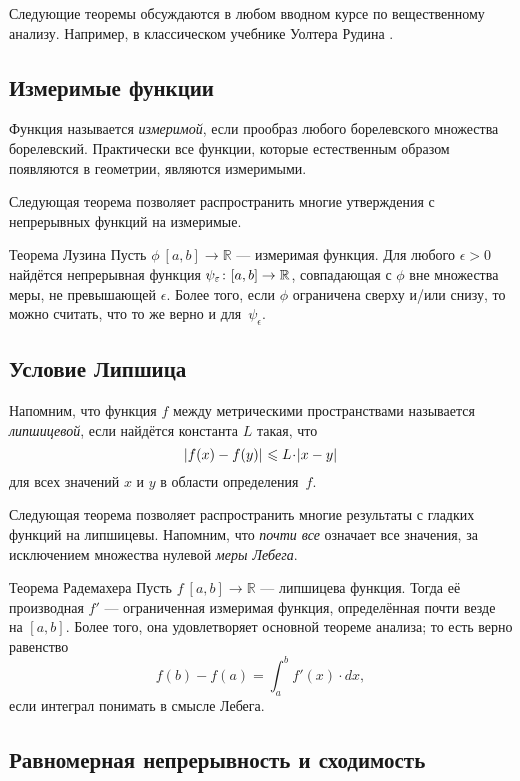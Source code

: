 Следующие теоремы обсуждаются в любом вводном курсе по вещественному анализу.
Например, в классическом учебнике Уолтера Рудина \cite{rudin}.

\subsection*{Измеримые функции}

Функция называется \emph{измеримой}, если прообраз любого борелевского множества борелевский.
Практически все функции, которые естественным образом появляются в геометрии, являются измеримыми.

Следующая теорема позволяет распространить многие утверждения с непрерывных функций на измеримые.

\begin{thm}{Теорема Лузина}\label{thm:lusin}
Пусть $\phi\:[a,b]\to \mathbb{R}$ --- измеримая функция.
Для любого $\epsilon>0$ найдётся непрерывная функция $\psi_\epsilon\:[a,b]\z\to \mathbb{R}$, совпадающая с $\phi$ вне множества меры, не превышающей $\epsilon$.
Более того, если $\phi$ ограничена сверху и/или снизу, то можно считать, что то же верно и для~$\psi_\epsilon$.  
\end{thm}

\subsection*{Условие Липшица}

Напомним, что функция $f$ между метрическими пространствами называется \emph{липшицевой}, если найдётся константа $L$ такая, что 
\[\dist{f(x)}{f(y)}{}\le L\cdot\dist{x}{y}{}\]
для всех значений $x$ и $y$ в области определения~$f$.

Следующая теорема позволяет распространить многие результаты с гладких функций на липшицевы.
Напомним, что {}\emph{почти все} означает все значения, за исключением множества нулевой {}\emph{меры Лебега}.

\begin{thm}{Теорема Радемахера}\label{thm:rademacher}
Пусть $f\:[a,b]\to\mathbb{R}$ --- липшицева функция.
Тогда её производная $f'$ --- ограниченная измеримая функция, определённая почти везде на $[a,b]$.
Более того, она удовлетворяет основной теореме анализа; то есть верно равенство 
\[f(b)-f(a)=\int_a^b f'(x)\cdot dx,\]
если интеграл понимать в смысле Лебега.
\end{thm}

\subsection*{Равномерная непрерывность и сходимость}

